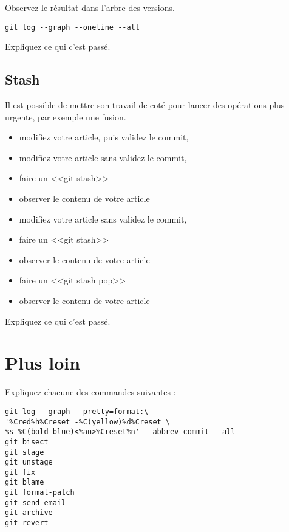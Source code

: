 \documentclass[a4paper]{article}
\begin{document}
Observez le résultat dans l'arbre des versions. 
\begin{verbatim}
git log --graph --oneline --all
\end{verbatim}

Expliquez ce qui c'est passé.

\subsection{Stash}

Il est possible de mettre son travail de coté pour lancer des opérations plus urgente, par exemple une fusion.

\begin{itemize}
  \item modifiez votre article, puis validez le commit,
  \item modifiez votre article sans validez le commit,
  \item faire un <<git stash>>
  \item observer le contenu de votre article
  \item modifiez votre article sans validez le commit,
  \item faire un <<git stash>>
  \item observer le contenu de votre article
  \item faire un <<git stash pop>> 
  \item observer le contenu de votre article
\end{itemize}

Expliquez ce qui c'est passé.

\section{Plus loin}

Expliquez chacune des commandes suivantes :
\begin{verbatim}
git log --graph --pretty=format:\
'%Cred%h%Creset -%C(yellow)%d%Creset \
%s %C(bold blue)<%an>%Creset%n' --abbrev-commit --all
git bisect
git stage
git unstage
git fix 
git blame 
git format-patch
git send-email
git archive
git revert
\end{verbatim}
\end{document}
